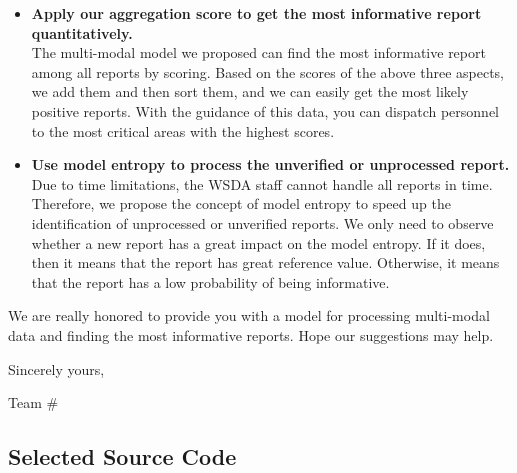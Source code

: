 \documentclass{mcmthesis}
\begin{document}
\begin{itemize}
        \item \textbf{Apply our aggregation score to get the most informative report quantitatively.} \\
        The multi-modal model we proposed can find the most informative report among all reports by scoring. Based on the scores of the above three aspects, we add them and then sort them, and we can easily get the most likely positive reports. With the guidance of this data, you can dispatch personnel to the most critical areas with the highest scores.
        
        \item \textbf{Use model entropy to process the unverified or unprocessed report.} \\
        Due to time limitations, the WSDA staff cannot handle all reports in time. Therefore, we propose the concept of model entropy to speed up the identification of unprocessed or unverified reports. We only need to observe whether a new report has a great impact on the model entropy. If it does, then it means that the report has great reference value. Otherwise, it means that the report has a low probability of being informative.
    \end{itemize}

We are really honored to provide you with a model for processing multi-modal data and finding the most informative reports. Hope our suggestions may help.

\noindent Sincerely yours, 

\noindent Team \#\TeamNumber


\newpage


\begin{appendices}
\section{Selected Source Code}

\noindent \textbf{\tt {}}


\noindent \textbf{\tt {}}



\end{appendices}
\end{document}
